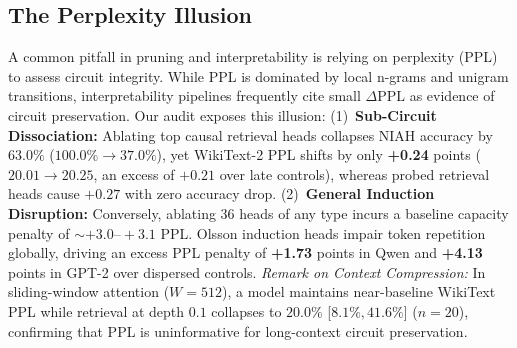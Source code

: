 \documentclass[11pt]{article}
\begin{document}
\subsection{The Perplexity Illusion}
A common pitfall in pruning and interpretability is relying on perplexity (PPL) to assess circuit integrity. While PPL is dominated by local n-grams and unigram transitions, interpretability pipelines frequently cite small $\Delta\text{PPL}$ as evidence of circuit preservation. Our audit exposes this illusion: (1)~\textbf{Sub-Circuit Dissociation:} Ablating top causal retrieval heads collapses NIAH accuracy by $63.0\%$ ($100.0\% \to 37.0\%$), yet WikiText-2 PPL shifts by only \textbf{+0.24} points ($20.01 \to 20.25$, an excess of $+0.21$ over late controls), whereas probed retrieval heads cause $+0.27$ with zero accuracy drop. (2)~\textbf{General Induction Disruption:} Conversely, ablating 36 heads of any type incurs a baseline capacity penalty of $\sim +3.0\text{--}+3.1$ PPL. Olsson induction heads impair token repetition globally, driving an excess PPL penalty of \textbf{+1.73} points in Qwen and \textbf{+4.13} points in GPT-2 over dispersed controls.
\textit{Remark on Context Compression:} In sliding-window attention ($W=512$), a model maintains near-baseline WikiText PPL while retrieval at depth $0.1$ collapses to $20.0\%$ [$8.1\%, 41.6\%$] ($n=20$), confirming that PPL is uninformative for long-context circuit preservation.

\begin{table}[t]
\centering
\small
{}
\caption{Random ablation controls on Qwen-2.5-0.5B ($k=36$ heads ablated, 20 draws each). Dispersed controls preserve a mean accuracy of $61.9\%$, suggesting that prior collapses were substantially influenced by layer bottleneck choking rather than sink collisions.}
\label{tab:controls}
\end{table}
\end{document}
